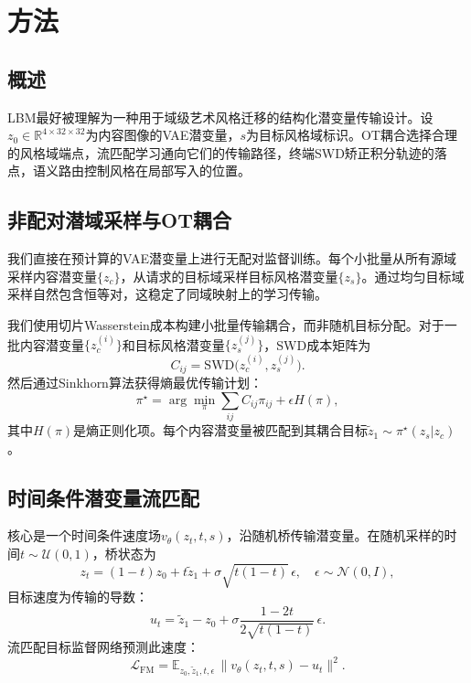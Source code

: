 ﻿\documentclass[letterpaper]{article}
\begin{document}
\section{方法}
\subsection{概述}
LBM最好被理解为一种用于域级艺术风格迁移的结构化潜变量传输设计。设$z_0 \in \mathbb{R}^{4 \times 32 \times 32}$为内容图像的VAE潜变量，$s$为目标风格域标识。OT耦合选择合理的风格域端点，流匹配学习通向它们的传输路径，终端SWD矫正积分轨迹的落点，语义路由控制风格在局部写入的位置。

\subsection{非配对潜域采样与OT耦合}
我们直接在预计算的VAE潜变量上进行无配对监督训练。每个小批量从所有源域采样内容潜变量$\{z_c\}$，从请求的目标域采样目标风格潜变量$\{z_s\}$。通过均匀目标域采样自然包含恒等对，这稳定了同域映射上的学习传输。

我们使用切片Wasserstein成本构建小批量传输耦合，而非随机目标分配。对于一批内容潜变量$\{z_c^{(i)}\}$和目标风格潜变量$\{z_s^{(j)}\}$，SWD成本矩阵为
\begin{equation}
    C_{ij} = \mathrm{SWD}\bigl(z_c^{(i)}, z_s^{(j)}\bigr) .
\end{equation}
然后通过Sinkhorn算法获得熵最优传输计划：
\begin{equation}
    \pi^\star = \arg\min_\pi \sum_{ij} C_{ij}\pi_{ij} + \epsilon H(\pi),
\end{equation}
其中$H(\pi)$是熵正则化项。每个内容潜变量被匹配到其耦合目标$\tilde{z}_1 \sim \pi^\star(z_s|z_c)$。

\subsection{时间条件潜变量流匹配}
核心是一个时间条件速度场$v_\theta(z_t,t,s)$，沿随机桥传输潜变量。在随机采样的时间$t\sim\mathcal{U}(0,1)$，桥状态为
\begin{equation}
    z_t = (1-t)z_0 + t\tilde{z}_1 + \sigma\sqrt{t(1-t)}\,\epsilon,
    \quad \epsilon\sim\mathcal{N}(0,I),
\end{equation}
目标速度为传输的导数：
\begin{equation}
    u_t = \tilde{z}_1 - z_0 + \sigma\frac{1-2t}{2\sqrt{t(1-t)}}\,\epsilon .
\end{equation}
流匹配目标监督网络预测此速度：
\begin{equation}
    \mathcal{L}_{\mathrm{FM}} = \mathbb{E}_{z_0,\tilde{z}_1,t,\epsilon}\,
    \bigl\|v_\theta(z_t,t,s) - u_t\bigr\|^2 .
\end{equation}
\end{document}

